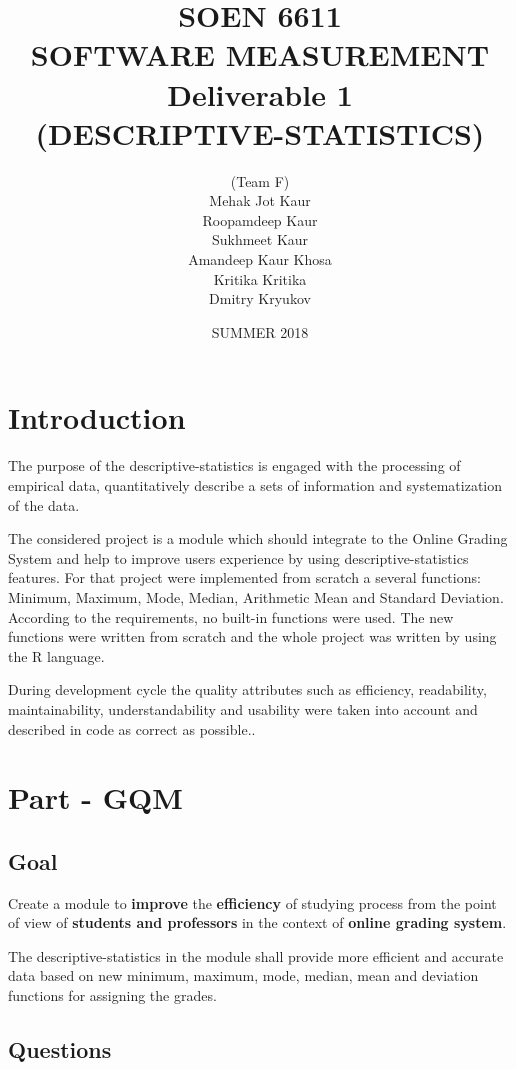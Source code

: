 \documentclass[12pt]{article}
\title{SOEN 6611 \\ SOFTWARE MEASUREMENT \\ Deliverable 1 \\
(DESCRIPTIVE-STATISTICS)}
\date{SUMMER 2018}
\author{(Team F)\\ 
Mehak Jot Kaur\\
Roopamdeep Kaur\\
Sukhmeet Kaur\\
Amandeep Kaur Khosa\\
Kritika Kritika\\
Dmitry Kryukov
}
\begin{document}
            
\maketitle                  
\newpage
\section{Introduction}
The purpose of the descriptive-statistics is engaged with the processing of empirical data, quantitatively describe a sets of information and systematization of the data. 

The considered project is a module which should integrate to the Online Grading System and help to improve users experience by using descriptive-statistics features. For that project were implemented from scratch a several functions: Minimum, Maximum, Mode, Median, Arithmetic Mean and Standard Deviation. According to the requirements, no built-in functions were used. The new functions were written from scratch and the whole project was written by using the R language.

During development cycle the quality attributes such as efficiency, readability,  maintainability, understandability and usability were taken into account and described in code as correct as possible..

\section{Part - GQM}      
\subsection{Goal}
Create a module to \textbf{improve} the \textbf{efficiency} of studying process from the point of view of \textbf{students and professors} in the context of \textbf{online grading system}. \par 
The descriptive-statistics in the module shall provide more efficient and accurate data based on new minimum, maximum, mode, median, mean and deviation functions for assigning the grades. \cite{GQM-book2} \cite{GQM-book}  \cite{GQM-eduardo} \cite{GQM-Bjorn} \cite{GQM} \cite{GQM-approach} \cite{GQM-wiki} 

\subsection{Questions}
\end{document}
